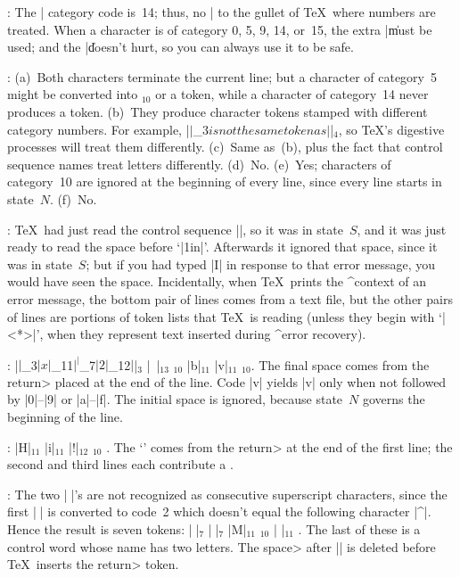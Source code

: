 {{{:
 The |%
category code is~14; thus, no |%
to the gullet of \TeX\ where numbers are treated. When a character is
of category 0, 5, 9, 14, or~15, the extra |\| must be used; and the
|\| doesn't hurt, so you can always use it to be safe.

:
 (a)~Both characters terminate the current line; but a character of
category~5 might be converted into \]$_{10}$ or a  token, while
a character of category~14 never produces a token.  (b)~They produce
character tokens stamped with different category numbers.  For example,
|$|$_3$ is not the same token as |$|$_4$, so \TeX's digestive processes
will treat them differently.  (c)~Same as~(b), plus the fact that control
sequence names treat letters differently.  (d)~No. (e)~Yes; characters of
category~10 are ignored at the beginning of every line, since every line
starts in state~$N$. (f)~No.

:
 \TeX\ had just read the control sequence |\vship|, so it
was in state~$S$, and it was just ready to read the space before `|1in|'.
Afterwards it ignored that space, since it was in state~$S$; but if
you had typed |I\obeyspaces| in response to that error message,
you would have seen the space. Incidentally, when \TeX\ prints
the ^{context of an error message}, the bottom pair of lines comes from
a text file, but the other pairs of lines are portions of token lists
that \TeX\ is reading (unless they begin with `|<*>|', when they
represent text inserted during ^{error recovery}).

:
 |$|$_{3}$ |x|$_{11}$ |^|$_7$ |2|$_{12}$ |$|$_{3}$ |~|$_{13}$ \]$_{10}$
 |b|$_{11}$ |v|$_{11}$ \]$_{10}$. The final space comes from the
\<return> placed at the end of the line. Code |^^6| yields |v| only
when not followed by |0|--|9| or |a|--|f|.
The initial space is ignored, because state~$N$
governs the beginning of the line.

:
 |H|$_{11}$ |i|$_{11}$ |!|$_{12}$ \]$_{10}$ 
. The `\]' comes from the \<return> at the
end of the first line; the second and third lines each contribute
a .

:
 The two |^^B|'s are not recognized as consecutive superscript
characters, since the first |^^B| is converted to code~2 which doesn't
equal the following character |^|. Hence
the result is seven tokens: |^^B|$_7$ |^^B|$_7$
|M|$_{11}$  \]$_{10}$ |^^M|$_{11}$ .
The last of these is a control word whose name has two letters.
The \<space> after |\M| is deleted before \TeX\ inserts the \<return> token.

}}}
